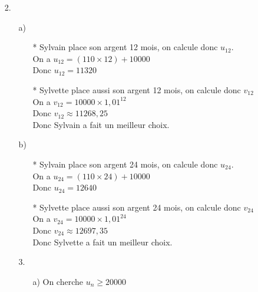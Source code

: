 \newpage

\begin{itemize}
\item[2.]
\begin{itemize}
\item[a)]
\begin{itemize}
\item[*] Sylvain place son argent 12 mois, on calcule donc $u_{12}$. \\

On a $u_{12} = \left(110 \times 12\right) + 10 000$ \\

Donc $u_{12} = 11320$ \\

\item[*] Sylvette place aussi son argent 12 mois, on calcule donc $v_{12}$ \\

On a $v_{12} = 10 000 \times 1,01^{12}$ \\

Donc $v_{12} \approx 11 268,25$ \\

Donc Sylvain a fait un meilleur choix. \\
\end{itemize}
\item[b)] 
\begin{itemize}
\item[*] Sylvain place son argent 24 mois, on calcule donc $u_{24}$. \\

On a $u_{24} = \left(110 \times 24\right) + 10 000$ \\

Donc $u_{24} = 12640$ \\

\item[*] Sylvette place aussi son argent 24 mois, on calcule donc $v_{24}$ \\

On a $v_{24} = 10 000 \times 1,01^{24}$ \\

Donc $v_{24} \approx 12 697,35$ \\

Donc Sylvette a fait un meilleur choix. \\
\end{itemize}
\item[3.] 
\begin{itemize}
\item[a)] On cherche $u_n \geqslant 20 000$ \\


\end{itemize}
\end{itemize}
\end{itemize}
